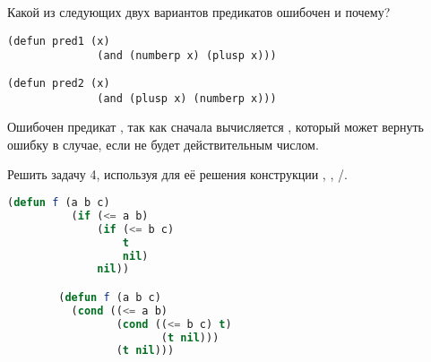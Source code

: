 \documentclass[a4paper,oneside,12pt]{extreport}
\begin{document}
\begin{task}
	Какой из следующих двух вариантов предикатов ошибочен и почему?
	\begin{AutoMultiColEnumerate}
		\item \begin{lstlisting}[style=lispinline, gobble=24]
			(defun pred1 (x)
			  (and (numberp x) (plusp x)))
		\end{lstlisting}

		\item \begin{lstlisting}[style=lispinline, gobble=24]
			(defun pred2 (x)
			  (and (plusp x) (numberp x)))
		\end{lstlisting}
	\end{AutoMultiColEnumerate}

	Ошибочен предикат , так как сначала вычисляется , который может вернуть ошибку в случае, если  не будет действительным числом.
\end{task}

\begin{task}
	Решить задачу 4, используя для её решения конструкции , , /.

	\begin{lstlisting}[language=Lisp, gobble=16]
		(defun f (a b c)
		  (if (<= a b)
		      (if (<= b c)
		          t
		          nil)
		      nil))

		(defun f (a b c)
		  (cond ((<= a b)
		         (cond ((<= b c) t)
		                (t nil)))
		         (t nil)))
	\end{lstlisting}
\end{task}





\end{document}
